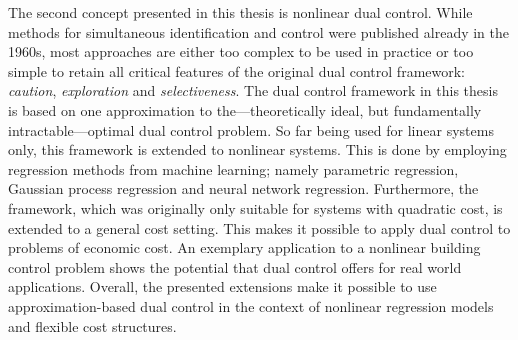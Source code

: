 The second concept presented in this thesis is nonlinear dual control. While
methods for simultaneous identification and control were published already in
the 1960s, most approaches are either too complex to be used in practice or too
simple to retain all critical features of the original dual control framework:
\emph{caution}, \emph{exploration} and \emph{selectiveness}. The dual control
framework in this thesis is based on one approximation to the---theoretically
ideal, but fundamentally intractable---optimal dual control problem. So far
being used for linear systems only, this framework is extended to nonlinear
systems. This is done by employing regression methods from machine learning;
namely parametric regression, Gaussian process regression and neural network
regression. Furthermore, the framework, which was originally only suitable for
systems with quadratic cost, is extended to a general cost setting. This makes
it possible to apply dual control to problems of economic cost. An exemplary
application to a nonlinear building control problem shows the potential that
dual control offers for real world applications. Overall, the presented
extensions make it possible to use approximation-based dual control in the
context of nonlinear regression models and flexible cost structures.

\clearpage

